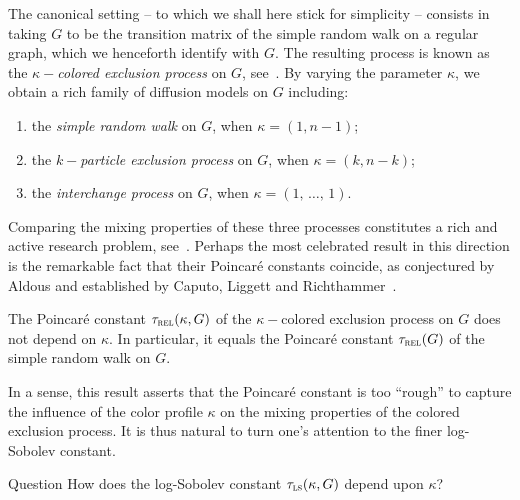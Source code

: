 \documentclass[AHL,Unicode,longabstracts,published]{cedram}
\newcommand{\trel}{\tau_{\textsc{rel}}}
\newcommand{\tls}{\tau_{\textsc{ls}}}
\begin{document}
The canonical setting -- to which we shall here stick for simplicity -- consists in taking $G$ to be the transition matrix of the simple random walk on a regular graph, which we henceforth identify with $G$. The resulting process is known as the $\kappa-$\emph{colored exclusion process} on $G$, see~\cite{MR2629990}. By varying the parameter $\kappa$, we obtain a rich family of diffusion models on $G$ including:
\begin{enumerate}
\item the \emph{simple random walk} on $G$, when $\kappa=(1,n-1)$;
\item the \emph{$k-$particle exclusion process} on $G$, when $\kappa=(k,n-k)$;
\item the \emph{interchange process} on $G$, when $\kappa=(1,\,\ldots,\,1)$.
\end{enumerate}

Comparing the mixing properties of these three processes constitutes a rich and active research problem, see~\cite{2018arXiv181110537A,MR2629990,MR3978223,hermon2018exclusion, MR3069380,MR2244427,MR3077529, MR2023023}. Perhaps the most celebrated result in this direction is the remarkable fact that their Poincaré constants coincide, as conjectured by Aldous and established by Caputo, Liggett and Richthammer~\cite{MR2629990}.

\begin{theo}\label{th:aldous}
The Poincaré constant $\trel(\kappa,G)$ of the $\kappa-$colored exclusion process on $G$ does not depend on $\kappa$. In particular, it equals the Poincaré constant $\trel(G)$ of the simple random walk on $G$.
\end{theo}

In a sense, this result asserts that the Poincaré constant is too ``rough'' to capture the influence of the color profile $\kappa$ on the mixing properties of the colored exclusion process. It is thus natural to turn one's attention to the finer log-Sobolev constant.

\begin{enonce}[remark]{Question}
How does the log-Sobolev constant $\tls(\kappa,G)$ depend upon $\kappa$?
\end{enonce}
\end{document}

